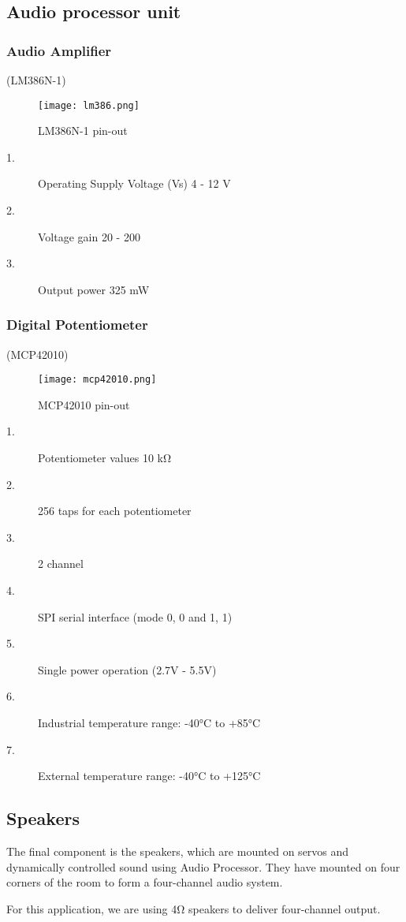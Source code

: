 \documentclass[../../../patent_v1.tex]{subfiles}
\begin{document}
\subsection{Audio processor unit}

\subsubsection{Audio Amplifier}

(LM386N-1)

\begin{figure}[ht]
    \centering
    \texttt{[image: lm386.png]}
    \caption{LM386N-1 pin-out}
\end{figure}

\FloatBarrier

\begin{description}
    \item[1.]Operating Supply Voltage (Vs) 4 - 12 V
    \item[2.]Voltage gain 20 - 200
    \item[3.]Output power 325 mW
\end{description}

\subsubsection{Digital Potentiometer}

(MCP42010)

\begin{figure}[ht]
    \centering
    \texttt{[image: mcp42010.png]}
    \caption{MCP42010 pin-out}
\end{figure}

\FloatBarrier

\begin{description}
    \item[1.]Potentiometer values 10 k\si{\ohm}
    \item[2.]256 taps for each potentiometer
    \item[3.]2 channel
    \item[4.]SPI serial interface (mode 0, 0 and 1, 1)
    \item[5.]Single power operation (2.7V - 5.5V)
    \item[6.]Industrial temperature range: -40\si{\celsius} to +85\si{\celsius} 
    \item[7.]External temperature range: -40\si{\celsius} to +125\si{\celsius}    
\end{description}
 
\subsection{Speakers}

The final component is the speakers, which are mounted on servos and dynamically 
controlled sound using Audio Processor. They have mounted on four corners of the 
room to form a four-channel audio system. 

For this application, we are using 4\si{\ohm} speakers to deliver four-channel output.
\end{document}
